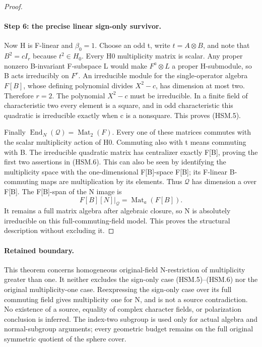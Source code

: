 \begin{proof}
\paragraph{Step 6: the precise linear sign-only survivor.}
Now H is F-linear and \(\beta_0=1\).  Choose an odd t,
write \(t=A\otimes B\), and note that \(B^2=cI_r\)
because \(t^2\in H_0\).  Every H0 multiplicity matrix is
scalar.  Any proper nonzero B-invariant F-subspace L would make
\(F^a\otimes L\) a proper H-submodule, so B acts
irreducibly on \(F^r\).  An irreducible module for the
single-operator algebra \(F[B]\), whose defining polynomial
divides \(X^2-c\), has dimension at most two.  Therefore
\(r=2\).  The polynomial \(X^2-c\) must be irreducible.
In a finite field of characteristic two every element is a
square, and in odd characteristic this quadratic is irreducible
exactly when c is a nonsquare.  This proves (HSM.5).

Finally \(\operatorname{End}_N(\mathcal Q)=\operatorname{Mat}_2(F)\).
Every one of these matrices commutes with the scalar multiplicity
action of H0.  Commuting also with t means commuting with B.
The irreducible quadratic matrix has centralizer exactly F[B],
proving the first two assertions in (HSM.6).  This can also be
seen by identifying the multiplicity space with the one-dimensional
F[B]-space F[B]; its F-linear B-commuting maps are multiplication
by its elements.  Thus \(\mathcal Q\) has dimension a
over F[B].  The F[B]-span of the N image is
\[
          F[B][N]\big|_{\mathcal Q}
                      =\operatorname{Mat}_a(F[B]).
 \tag{HSM.15}
\]
It remains a full matrix algebra after algebraic closure, so N
is absolutely irreducible on this full-commuting-field model.
This proves the structural description without excluding it.
\end{proof}

\paragraph{Retained boundary.}
This theorem concerns homogeneous original-field N-restriction
of multiplicity greater than one.  It neither excludes the
sign-only case (HSM.5)--(HSM.6) nor the original multiplicity-one
case.  Reexpressing the sign-only case over its full commuting
field gives multiplicity one for N, and is not a source
contradiction.  No existence of a source, equality of complex
character fields, or polarization conclusion is inferred.
The index-two subgroup is used only for actual algebra and
normal-subgroup arguments; every geometric budget remains on
the full original symmetric quotient of the sphere cover.
